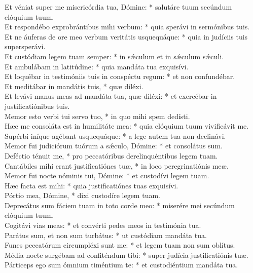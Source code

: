 {	Et véniat super me misericórdia tua, Dómine: * salutáre tuum secúndum elóquium tuum. \\
	Et respondébo exprobrántibus mihi verbum: * quia sperávi in sermónibus tuis. \\
	Et ne áuferas de ore meo verbum veritátis usquequáque: * quia in judíciis tuis supersperávi. \\
	Et custódiam legem tuam semper: * in sǽculum et in sǽculum sǽculi. \\
	Et ambulábam in latitúdine: * quia mandáta tua exquisívi. \\
	Et loquébar in testimóniis tuis in conspéctu regum: * et non confundébar. \\
	Et meditábar in mandátis tuis, * quæ diléxi. \\
	Et levávi manus meas ad mandáta tua, quæ diléxi: * et exercébar in justificatiónibus tuis. \\
	Memor esto verbi tui servo tuo, * in quo mihi spem dedísti. \\
	Hæc me consoláta est in humilitáte mea: * quia elóquium tuum vivificávit me. \\
	Supérbi iníque agébant usquequáque: * a lege autem tua non declinávi. \\
	Memor fui judiciórum tuórum a sǽculo, Dómine: * et consolátus sum. \\
	Deféctio ténuit me, * pro peccatóribus derelinquéntibus legem tuam. \\
	Cantábiles mihi erant justificatiónes tuæ, * in loco peregrinatiónis meæ. \\
	Memor fui nocte nóminis tui, Dómine: * et custodívi legem tuam. \\
	Hæc facta est mihi: * quia justificatiónes tuas exquisívi. \\
	Pórtio mea, Dómine, * dixi custodíre legem tuam. \\
	Deprecátus sum fáciem tuam in toto corde meo: * miserére mei secúndum elóquium tuum. \\
	Cogitávi vias meas: * et convérti pedes meos in testimónia tua. \\
	Parátus sum, et non sum turbátus: * ut custódiam mandáta tua. \\
	Funes peccatórum circumpléxi sunt me: * et legem tuam non sum oblítus. \\
	Média nocte surgébam ad confiténdum tibi: * super judícia justificatiónis tuæ. \\
	Párticeps ego sum ómnium timéntium te: * et custodiéntium mandáta tua. \\
}
